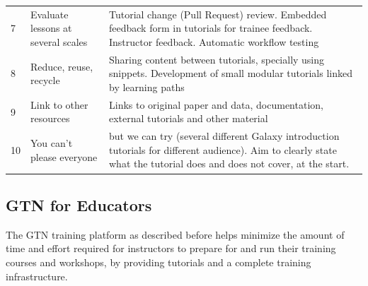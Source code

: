 \begin{table}[h!t]
\begin{tabular}{|l|p{}|p{}|}
		\rule{0pt}{3.6ex}
		7 &  Evaluate lessons at several scales                  & Tutorial change (Pull Request) review. Embedded feedback form in tutorials for trainee feedback. Instructor feedback. Automatic workflow testing \\
		
		\rule{0pt}{3.6ex}
		8 & Reduce, reuse, recycle                             & Sharing content between tutorials, specially using snippets. Development of small modular tutorials linked by learning paths \\
		
		\rule{0pt}{3.6ex}
		9 & Link to other resources                             & Links to original paper and data, documentation, external tutorials and other material \\
		
		\rule{0pt}{3.6ex}
		10 & You can't please everyone                           & but we can try (several different Galaxy introduction tutorials for different audience). Aim to clearly state what the tutorial does and does not cover, at the start.  \\
		\hline
	\end{tabular}
\end{table}



\subsection*{GTN for Educators}
The GTN training platform as described before helps minimize the amount of time and effort required for instructors to prepare for and run their training courses and workshops, by providing tutorials and a complete training infrastructure.

